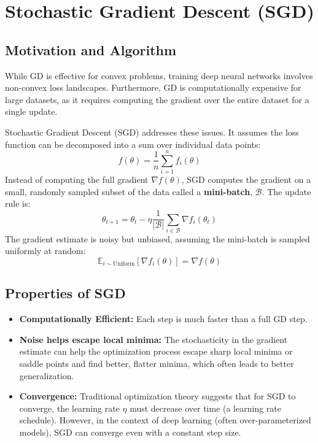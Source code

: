 \documentclass[11pt]{article}
\newcommand{\E}{\mathbb{E}}
\begin{document}
\section{Stochastic Gradient Descent (SGD)}
\subsection{Motivation and Algorithm}
While GD is effective for convex problems, training deep neural networks involves non-convex loss landscapes. Furthermore, GD is computationally expensive for large datasets, as it requires computing the gradient over the entire dataset for a single update.

Stochastic Gradient Descent (SGD) addresses these issues. It assumes the loss function can be decomposed into a sum over individual data points:
\begin{equation}
    f(\theta) = \frac{1}{n} \sum_{i=1}^n f_i(\theta)
\end{equation}
Instead of computing the full gradient $\nabla f(\theta)$, SGD computes the gradient on a small, randomly sampled subset of the data called a \textbf{mini-batch}, $\mathcal{B}$. The update rule is:
\begin{equation}
    \theta_{t+1} = \theta_t - \eta \frac{1}{|\mathcal{B}|} \sum_{i \in \mathcal{B}} \nabla f_i(\theta_t)
\end{equation}
The gradient estimate is noisy but unbiased, assuming the mini-batch is sampled uniformly at random:
\begin{equation}
    \E_{i \sim \text{Uniform}}[\nabla f_i(\theta)] = \nabla f(\theta)
\end{equation}

\subsection{Properties of SGD}
\begin{itemize}
    \item \textbf{Computationally Efficient:} Each step is much faster than a full GD step.
    \item \textbf{Noise helps escape local minima:} The stochasticity in the gradient estimate can help the optimization process escape sharp local minima or saddle points and find better, flatter minima, which often leads to better generalization.
    \item \textbf{Convergence:} Traditional optimization theory suggests that for SGD to converge, the learning rate $\eta$ must decrease over time (a learning rate schedule). However, in the context of deep learning (often over-parameterized models), SGD can converge even with a constant step size.
\end{itemize}
\end{document}
